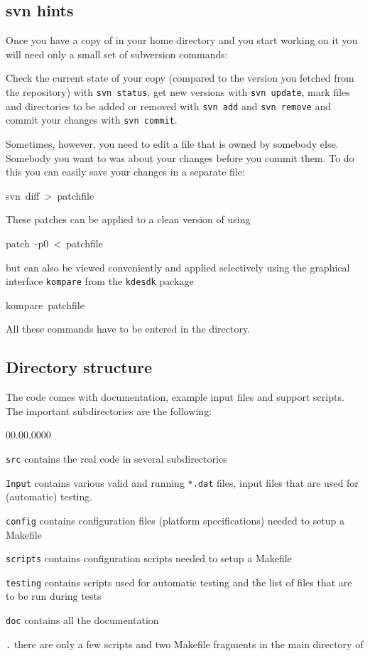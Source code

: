\subsection{svn hints}

Once you have a copy of \baci{} in your home directory and you start
working on it you will need only a small set of subversion commands:

Check the current state of your copy (compared to the version
\baci{} you fetched from the repository) with \texttt{svn~status}, get
new versions with \texttt{svn~update}, mark files and directories to
be added or removed with \texttt{svn~add} and \texttt{svn~remove}
and commit your changes with \texttt{svn~commit}.

Sometimes, however, you need to edit a file that is owned by somebody
else. Somebody you want to was about your changes before you commit
them. To do this you can easily save your changes in a separate file:
\begin{lyxcode}
svn~diff~>~patchfile
\end{lyxcode}
These patches can be applied to a clean version of \baci{} using
\begin{lyxcode}
patch~-p0~<~patchfile
\end{lyxcode}
but can also be viewed conveniently and applied selectively using the
graphical interface \texttt{kompare} from the \texttt{kdesdk} package
\begin{lyxcode}
kompare~patchfile
\end{lyxcode}
All these commands have to be entered in the \ccarat{} directory.

\subsection{Directory structure}

The \ccarat{} code comes with documentation, example input files
and support scripts. The important subdirectories are the following:

\begin{lyxlist}{00.00.0000}
\item [{\texttt{src}}] contains the real \ccarat{} code in several subdirectories
\item [{\texttt{Input}}] contains various valid and running \texttt{{*}.dat}
files, \ccarat{} input files that are used for (automatic) testing.
\item [{\texttt{config}}] contains configuration files (platform specifications)
needed to setup a \ccarat{} Makefile
\item [{\texttt{scripts}}] contains configuration scripts needed to setup
a \ccarat{} Makefile
\item [{\texttt{testing}}] contains scripts used for automatic testing
and the list of files that are to be run during tests
\item [{\texttt{doc}}] contains all the documentation
\item [{\texttt{.}}] there are only a few scripts and two Makefile fragments
in the main directory of \ccarat{}
\end{lyxlist}

